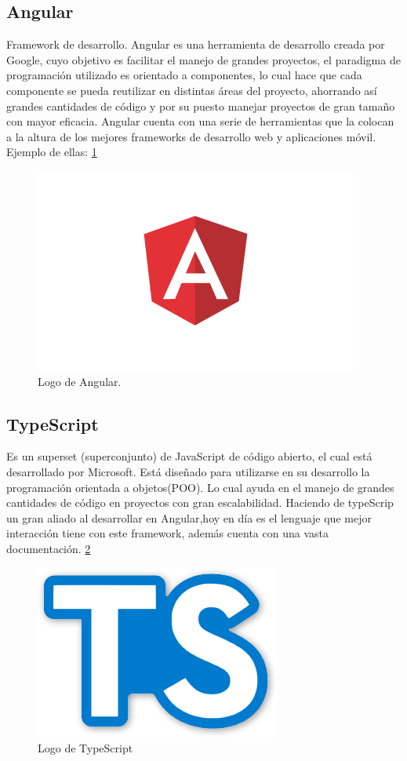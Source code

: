 \subsection{Angular}
Framework de desarrollo.
Angular es una herramienta de desarrollo creada por Google, cuyo objetivo es facilitar el manejo de grandes proyectos, el paradigma de programación utilizado es orientado a componentes, lo cual hace que cada componente se pueda reutilizar en distintas áreas del proyecto, ahorrando así grandes cantidades de código y por su puesto manejar proyectos de gran tamaño con mayor eficacia. Angular cuenta con una serie de herramientas que la colocan a la altura de los mejores frameworks de desarrollo web y aplicaciones móvil.  Ejemplo de ellas: \cite{Angular} \ref{figura9}
\begin{figure}[h]
  \label{figura9}
  \centering
  \includegraphics[scale=.70]{lib/assets/9}
  \caption{Logo de Angular.}
\end{figure}



\subsection{TypeScript}
Es un superset (superconjunto) de JavaScript de código abierto, el cual está desarrollado por Microsoft. Está diseñado para utilizarse en su desarrollo la programación orientada a objetos(POO). Lo cual ayuda en el manejo de grandes cantidades de código en proyectos con gran escalabilidad. Haciendo de typeScrip un gran aliado al desarrollar en Angular,hoy en día es el lenguaje que mejor interacción tiene con este framework, además cuenta con una vasta documentación. \cite{typeScript} \ref{figura10}
\begin{figure}[h]
  \label{figura10}
  \centering
  \includegraphics[scale=.35]{lib/assets/10}
  \caption{Logo de TypeScript}
\end{figure}



